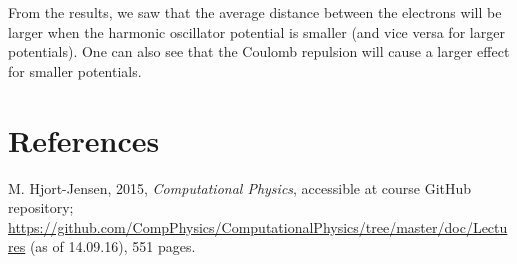 \documentclass[12pt]{article}
\begin{document}
From the results, we saw that the average distance between the electrons will be larger when the harmonic oscillator potential is smaller (and vice versa for larger potentials). One can also see that the Coulomb repulsion will cause a larger effect for smaller potentials. 
\section{References}
M. Hjort-Jensen, 2015, \textit{Computational Physics}, accessible at course GitHub repository; \url{https://github.com/CompPhysics/ComputationalPhysics/tree/master/doc/Lectures} (as of 14.09.16), 551 pages.
\end{document}
